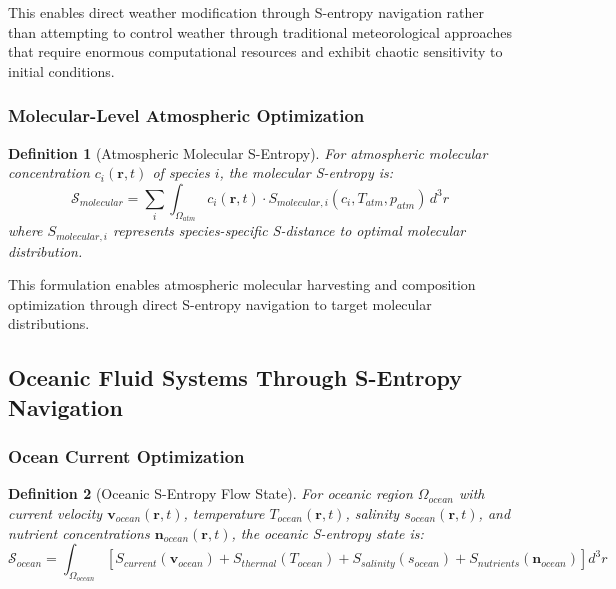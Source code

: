 \documentclass[12pt,a4paper]{article}
\newtheorem{definition}{Definition}
\begin{document}
This enables direct weather modification through S-entropy navigation rather than attempting to control weather through traditional meteorological approaches that require enormous computational resources and exhibit chaotic sensitivity to initial conditions.

\subsubsection{Molecular-Level Atmospheric Optimization}

\begin{definition}[Atmospheric Molecular S-Entropy]
For atmospheric molecular concentration $c_i(\mathbf{r}, t)$ of species $i$, the molecular S-entropy is:
\begin{equation}
\mathcal{S}_{molecular} = \sum_i \int_{\Omega_{atm}} c_i(\mathbf{r}, t) \cdot S_{molecular,i}(c_i, T_{atm}, p_{atm}) \, d^3r
\end{equation}
where $S_{molecular,i}$ represents species-specific S-distance to optimal molecular distribution.
\end{definition}

This formulation enables atmospheric molecular harvesting and composition optimization through direct S-entropy navigation to target molecular distributions.

\subsection{Oceanic Fluid Systems Through S-Entropy Navigation}

\subsubsection{Ocean Current Optimization}

\begin{definition}[Oceanic S-Entropy Flow State]
For oceanic region $\Omega_{ocean}$ with current velocity $\mathbf{v}_{ocean}(\mathbf{r}, t)$, temperature $T_{ocean}(\mathbf{r}, t)$, salinity $s_{ocean}(\mathbf{r}, t)$, and nutrient concentrations $\mathbf{n}_{ocean}(\mathbf{r}, t)$, the oceanic S-entropy state is:
\begin{equation}
\mathcal{S}_{ocean} = \int_{\Omega_{ocean}} \left[ S_{current}(\mathbf{v}_{ocean}) + S_{thermal}(T_{ocean}) + S_{salinity}(s_{ocean}) + S_{nutrients}(\mathbf{n}_{ocean}) \right] d^3r
\end{equation}
\end{definition}
\end{document}
